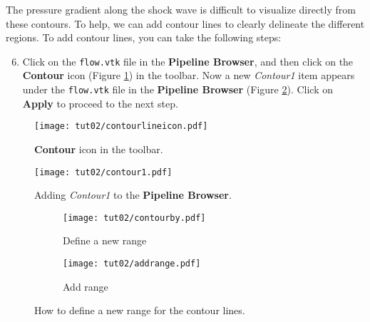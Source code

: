 The pressure gradient along the shock wave is difficult to visualize directly from these contours. To help, we can add contour lines to clearly delineate the different regions. To add contour lines, you can take the following steps:
\begin{enumerate}[label=\arabic*)]
	\setcounter{enumi}{5}
	\item Click on the \texttt{flow.vtk} file in the \textbf{Pipeline Browser}, and then click on the \textbf{Contour} icon (Figure \ref{fig2:contour_icon}) in the toolbar. Now a new \textit{Contour1} item appears under the \texttt{flow.vtk} file in the \textbf{Pipeline Browser} (Figure \ref{fig2:contour1}). Click on \textbf{Apply} to proceed to the next step.
\end{enumerate}
\begin{figure}[H]
    \centering
    \texttt{[image: tut02/contourlineicon.pdf]}
    \caption{\textbf{Contour} icon in the toolbar.}
    \label{fig2:contour_icon}
\end{figure}
\begin{figure}[ht]
    \centering
    \texttt{[image: tut02/contour1.pdf]}
    \caption{Adding \textit{Contour1} to the \textbf{Pipeline Browser}.}
    \label{fig2:contour1}
\end{figure}
\begin{figure}[ht]
	\centering
	\begin{subfigure}[b]{.4\textwidth}
		\centering
		\texttt{[image: tut02/contourby.pdf]}
		\caption{Define a new range}
		\label{fig2:contourby a}
	\end{subfigure}
	\hfill
	\begin{subfigure}[b]{.4\textwidth}
		\centering
		\texttt{[image: tut02/addrange.pdf]}
		\caption{Add range}
		\label{fig2:contourby b}
	\end{subfigure}     
	\caption{How to define a new range for the contour lines.}
	\label{fig2:contourby}
\end{figure}

